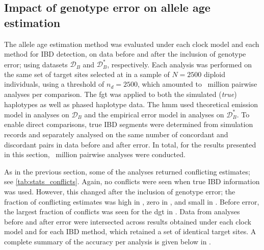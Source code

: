 %
\subsection{Impact of genotype error on allele age estimation}
\label{sec:age_generror}
%

The allele age estimation method was evaluated under each clock model and each method for IBD detection, on data before and after the inclusion of genotype error; \ie using datasets ${\mathcal{D}_B}$ and ${\mathcal{D}_B^{\ast}}$, respectively.
Each analysis was performed on the same set of  target sites selected at \fk{[2,25]} in a sample of ${N = \num{2500}}$ diploid individuals, using a threshold of ${n_d = \num{2500}}$, which amounted to ~million pairwise analyses per comparison.
The \gls{fgt} was applied to both the simulated (\emph{true}) haplotypes as well as phased haplotype data.
The \gls{hmm} used theoretical emission model in analyses on ${\mathcal{D}_B}$ and the empirical error model in analyses on ${\mathcal{D}_B^{\ast}}$.
To enable direct comparisons, true IBD segments were determined from simulation records and separately analysed on the same number of concordant and discordant pairs in data before and after error.
In total, for the results presented in this section, ~million pairwise analyses were conducted.

%

%

As in the previous section, some of the analyses returned conflicting estimates; see \cref{tab:stats_conflicts}.
Again, no conflicts were seen when true IBD information was used.
However, this changed after the inclusion of genotype error; the fraction of conflicting estimates was high in \ClockM, zero in \ClockR, and small in \ClockC.
Before error, the largest fraction of conflicts was seen for the \gls{dgt} in \ClockM.
Data from analyses before and after error were intersected across results obtained under each clock model and for each IBD method, which retained a set of  identical target sites.
A complete summary of the accuracy per analysis is given below in .

%

%

